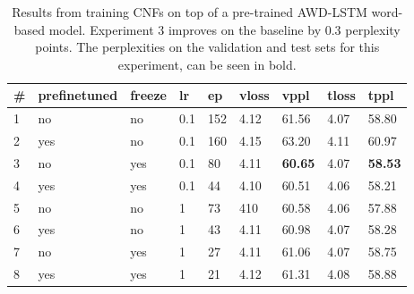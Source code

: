 \begin{table}
\centering
\caption{Results from training CNFs on top of a pre-trained AWD-LSTM word-based model. Experiment 3 improves on the baseline by 0.3 perplexity points. The perplexities on the validation and test sets for this experiment, can be seen in bold.}

\begin{tabular}{|l|l|l|l|l|l|l|l|l|}
\hline
\textbf{\#} & \textbf{prefinetuned} & \textbf{freeze} & \textbf{lr} & \textbf{ep} & \textbf{vloss} & \textbf{vppl} & \textbf{tloss} & \textbf{tppl}  \\ \hline
1       & no        & no        & 0.1       & 152       & 4.12      & 61.56     & 4.07      & 58.80 \\ \hline
2       & yes       & no        & 0.1       & 160       & 4.15      & 63.20     & 4.11      & 60.97 \\ \hline
3       & no        & yes       & 0.1       & 80        & 4.11      & \textbf{60.65}     & 4.07      & \textbf{58.53} \\ \hline
4       & yes       & yes       & 0.1       & 44        & 4.10      & 60.51     & 4.06      & 58.21 \\ \hline
5       & no        & no        & 1         & 73        & 410       & 60.58     & 4.06      & 57.88 \\ \hline
6       & yes       & no        & 1         & 43        & 4.11      & 60.98     & 4.07      & 58.28 \\ \hline
7       & no        & yes       & 1         & 27        & 4.11      & 61.06     & 4.07      & 58.75 \\ \hline
8       & yes       & yes       & 1         & 21        & 4.12      & 61.31     & 4.08      & 58.88 \\ \hline
\end{tabular}
\label{table:experiments:awd_cnf}
\end{table}


